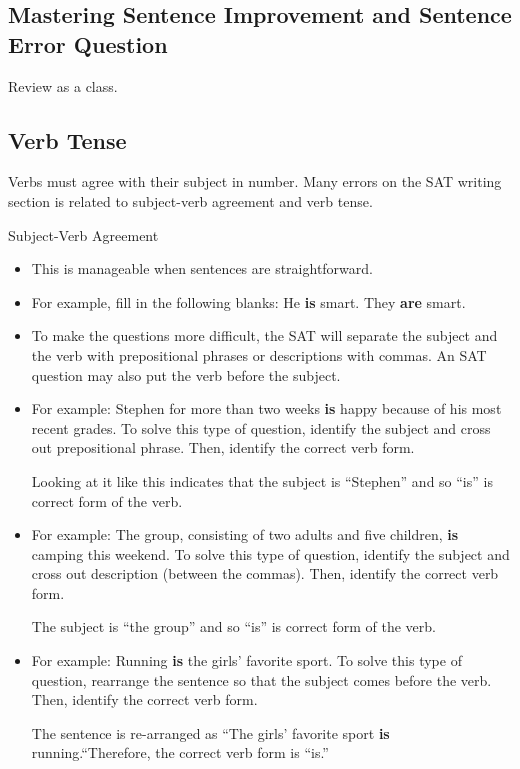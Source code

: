 \subsection{Mastering Sentence Improvement and Sentence Error Question}

Review as a class.

\subsection{Verb Tense}

Verbs must agree with their subject in number. Many errors on the SAT writing section is related to subject-verb agreement and verb tense.

Subject-Verb Agreement

\begin{itemize}
\item{This is manageable when sentences are straightforward.}
\item{For example, fill in the following blanks: He \textbf{is} smart. They \textbf{are} smart.}
\item{To make the questions more difficult, the SAT will separate the subject and the verb with prepositional phrases or descriptions
with commas. An SAT question may also put
the verb before the subject.}
\item{For example: Stephen for more than two weeks \textbf{is} happy because of his most recent grades. To solve
this type of question, identify the subject and cross out prepositional phrase. Then, identify
the correct verb form.}

\bigskip
Looking at it like this indicates that the subject is ``Stephen'' and so ``is'' is correct form of
the verb.

\item{For example: The group, consisting of two adults and five children, \textbf{is} camping this weekend. To solve this type of question, identify the subject and cross out description (between the commas). Then, identify the correct verb form.}

\bigskip
The subject is ``the group'' and so ``is'' is correct form of the verb.

\item{For example: Running \textbf{is} the girls' favorite sport. To solve this type of question, rearrange the sentence so that the subject comes before the verb. Then, identify the correct verb form.}

\bigskip
The sentence is re-arranged as ``The girls' favorite sport \textbf{is} running.``Therefore, the correct verb form is ``is.''
\end{itemize}

